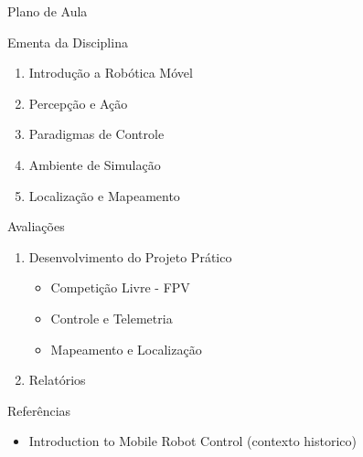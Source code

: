 \documentclass{beamer}
\begin{document}
\begin{frame}{Plano de Aula}
	\begin{block}{Ementa da Disciplina}
		\begin{enumerate}
			\item Introdução a Robótica Móvel
			\item Percepção e Ação
			\item Paradigmas de Controle
			\item Ambiente de Simulação
			\item Localização e Mapeamento
		\end{enumerate}
	\end{block}

	\begin{block}{Avaliações}
		\begin{enumerate}
			\item Desenvolvimento do Projeto Prático
				\begin{itemize}
					\item Competição Livre - FPV
					\item Controle e Telemetria
					\item Mapeamento e Localização
				\end{itemize}
			\item Relatórios
		\end{enumerate}
	\end{block}

\end{frame}



\begin{frame}[t]{Referências}
    \begin{itemize}
        \item Introduction to Mobile Robot Control (contexto historico)
    \end{itemize}
\end{frame}
\end{document}
